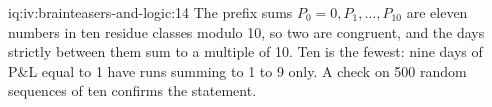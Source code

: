 \begin{solution}{iq:iv:brainteasers-and-logic:14}
The prefix sums $P_0 = 0, P_1, \dots, P_{10}$ are eleven numbers in ten residue classes modulo 10, so two are
congruent, and the days strictly between them sum to a multiple of 10. Ten is the fewest: nine days of P\&L equal
to 1 have runs summing to 1 to 9 only. A check on 500 random sequences of ten confirms the statement.
\end{solution}
